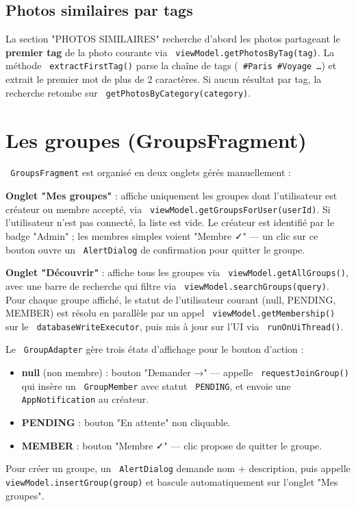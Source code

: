 \documentclass[a4paper,12pt,openany]{report}
\newcommand{\ic}[1]{\texttt{\small\colorbox{lightbg}{\color{navy!90} #1}}}
\begin{document}
\subsection{Photos similaires par tags}

La section "PHOTOS SIMILAIRES" recherche d'abord les photos partageant le
\textbf{premier tag} de la photo courante via \ic{viewModel.getPhotosByTag(tag)}.
La méthode \ic{extractFirstTag()} parse la chaîne de tags (\ic{\#Paris \#Voyage …})
et extrait le premier mot de plus de 2 caractères. Si aucun résultat par tag,
la recherche retombe sur \ic{getPhotosByCategory(category)}.

\section{Les groupes (GroupsFragment)}

\ic{GroupsFragment} est organisé en deux onglets gérés manuellement :

\textbf{Onglet "Mes groupes"} : affiche uniquement les groupes dont l'utilisateur
est créateur ou membre accepté, via \ic{viewModel.getGroupsForUser(userId)}.
Si l'utilisateur n'est pas connecté, la liste est vide. Le créateur est identifié
par le badge "Admin" ; les membres simples voient "Membre ✓" — un clic sur ce
bouton ouvre un \ic{AlertDialog} de confirmation pour quitter le groupe.

\textbf{Onglet "Découvrir"} : affiche tous les groupes via
\ic{viewModel.getAllGroups()}, avec une barre de recherche qui filtre via
\ic{viewModel.searchGroups(query)}. Pour chaque groupe affiché, le statut
de l'utilisateur courant (null, PENDING, MEMBER) est résolu en parallèle
par un appel \ic{viewModel.getMembership()} sur le
\ic{databaseWriteExecutor}, puis mis à jour sur l'UI via \ic{runOnUiThread()}.

Le \ic{GroupAdapter} gère trois états d'affichage pour le bouton d'action :
\begin{itemize}
  \item \textbf{null} (non membre) : bouton "Demander →" — appelle
    \ic{requestJoinGroup()} qui insère un \ic{GroupMember} avec statut
    \ic{PENDING}, et envoie une \ic{AppNotification} au créateur.
  \item \textbf{PENDING} : bouton "En attente" non cliquable.
  \item \textbf{MEMBER} : bouton "Membre ✓" — clic propose de quitter le groupe.
\end{itemize}

Pour créer un groupe, un \ic{AlertDialog} demande nom + description, puis
appelle \ic{viewModel.insertGroup(group)} et bascule automatiquement sur
l'onglet "Mes groupes".
\end{document}
